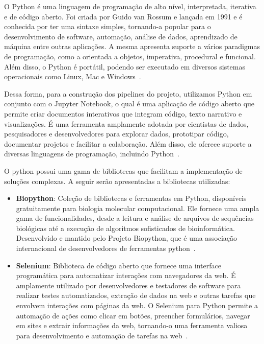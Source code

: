 O Python é uma linguagem de programação de alto nível, interpretada, iterativa e de código aberto. Foi criada por Guido van Rossum e lançada em 1991 e é conhecida por ter uma sintaxe simples, tornando-a popular para o desenvolvimento de software, automação, análise de dados, aprendizado de máquina entre outras aplicações. A mesma apresenta suporte a vários paradigmas de programação, como a orientada a objetos, imperativa, procedural e funcional. Além disso, o Python é portátil, podendo ser executado em diversos sistemas operacionais como Linux, Mac e Windows~\cite{python-reference}.

Dessa forma, para a construção dos pipelines do projeto, utilizamos Python em conjunto com o Jupyter Notebook, o qual é uma aplicação de código aberto que permite criar documentos interativos que integram código, texto narrativo e visualizações. É uma ferramenta amplamente adotada por cientistas de dados, pesquisadores e desenvolvedores para explorar dados, prototipar código, documentar projetos e facilitar a colaboração. Além disso, ele oferece suporte a diversas linguagens de programação, incluindo Python~\cite{jupyter-notebook}.

O python possui uma gama de bibliotecas que facilitam a implementação de soluções complexas. A seguir serão apresentadas a bibliotecas utilizadas:

\begin{itemize}
  \item \textbf{Biopython}: Coleção de bibliotecas e ferramentas em Python, disponíveis gratuitamente para biologia molecular computacional. Ele fornece uma ampla gama de funcionalidades, desde a leitura e análise de arquivos de sequências biológicas até a execução de algoritmos sofisticados de bioinformática. Desenvolvido e mantido pelo Projeto Biopython, que é uma associação internacional de desenvolvedores de ferramentas python~\cite{biopython}.
  \item \textbf{Selenium}: Biblioteca de código aberto que fornece uma interface programática para automatizar interações com navegadores da web. É amplamente utilizado por desenvolvedores e testadores de software para realizar testes automatizados, extração de dados na web e outras tarefas que envolvem interações com páginas da web. O Selenium para Python permite a automação de ações como clicar em botões, preencher formulários, navegar em sites e extrair informações da web, tornando-o uma ferramenta valiosa para desenvolvimento e automação de tarefas na web~\cite{selenium-python}.
\end{itemize}

